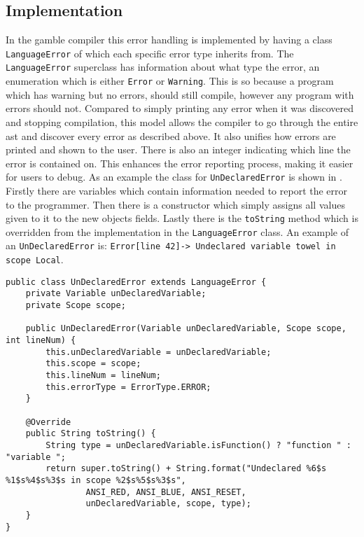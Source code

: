 \subsection*{Implementation}\label{subsec:ImplementationErrorHandling}
In the \gls{gamble} compiler this error handling is implemented by having a class \texttt{LanguageError} of which each specific error type inherits from.
The \texttt{LanguageError} superclass has information about what type the error, an enumeration which is either \texttt{Error} or \texttt{Warning}. 
This is so because a program which has warning but no errors, should still compile, however any program with errors should not. 
Compared to simply printing any error when it was discovered and stopping compilation, this model allows the compiler to go through the entire \acrshort{ast} and discover every error as described above. 
It also unifies how errors are printed and shown to the user.
There is also an integer indicating which line the error is contained on.
This enhances the error reporting process, making it easier for users to debug. 
As an example the class for \texttt{UnDeclaredError} is shown in .
Firstly there are variables which contain information needed to report the error to the programmer. 
Then there is a constructor which simply assigns all values given to it to the new objects fields.
Lastly there is the \texttt{toString} method which is overridden from the implementation in the \texttt{LanguageError} class. 
An example of an \texttt{UnDeclaredError} is: \texttt{Error[line   42]-> Undeclared variable towel in scope Local}. %

\begin{lstlisting}[caption=The UnDeclaredError class in the \gls{gamble} compiler,numbers=none,frame=tlrb,label={lst:undeclarederrorclass}]
public class UnDeclaredError extends LanguageError {
    private Variable unDeclaredVariable;
    private Scope scope;

    public UnDeclaredError(Variable unDeclaredVariable, Scope scope, int lineNum) {
        this.unDeclaredVariable = unDeclaredVariable;
        this.scope = scope;
        this.lineNum = lineNum;
        this.errorType = ErrorType.ERROR;
    }

    @Override
    public String toString() {
        String type = unDeclaredVariable.isFunction() ? "function " : "variable ";
        return super.toString() + String.format("Undeclared %6$s %1$s%4$s%3$s in scope %2$s%5$s%3$s",
                ANSI_RED, ANSI_BLUE, ANSI_RESET,
                unDeclaredVariable, scope, type);
    }
}
\end{lstlisting}

